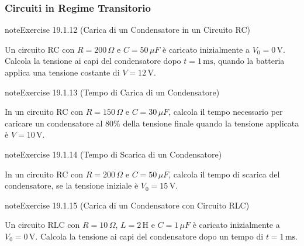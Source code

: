 \documentclass[letterpaper,10pt,italian]{jupyterBook}
\begin{document}
\subsubsection{Circuiti in Regime Transitorio}
\label{\detokenize{ch/electromagnetism/circuits-electric-problems:circuiti-in-regime-transitorio}} \label{exercise:ch/electromagnetism/circuits-electric-problems-exercise-11}

\begin{sphinxadmonition}{note}{Exercise 19.1.12 (Carica di un Condensatore in un Circuito RC)}



\sphinxAtStartPar
Un circuito RC con \(R = 200 \, \Omega\) e \(C = 50 \, \mu F\) è caricato inizialmente a \(V_0 = 0 \, \text{V}\). Calcola la tensione ai capi del condensatore dopo \(t = 1 \, \text{ms}\), quando la batteria applica una tensione costante di \(V = 12 \, \text{V}\).
\end{sphinxadmonition}
 \label{exercise:ch/electromagnetism/circuits-electric-problems-exercise-12}

\begin{sphinxadmonition}{note}{Exercise 19.1.13 (Tempo di Carica di un Condensatore)}



\sphinxAtStartPar
In un circuito RC con \(R = 150 \, \Omega\) e \(C = 30 \, \mu F\), calcola il tempo necessario per caricare un condensatore al 80\% della tensione finale quando la tensione applicata è \(V = 10 \, \text{V}\).
\end{sphinxadmonition}
 \label{exercise:ch/electromagnetism/circuits-electric-problems-exercise-13}

\begin{sphinxadmonition}{note}{Exercise 19.1.14 (Tempo di Scarica di un Condensatore)}



\sphinxAtStartPar
In un circuito RC con \(R = 200 \, \Omega\) e \(C = 50 \, \mu F\), calcola il tempo di scarica del condensatore, se la tensione iniziale è \(V_0 = 15 \, \text{V}\).
\end{sphinxadmonition}
 \label{exercise:ch/electromagnetism/circuits-electric-problems-exercise-14}

\begin{sphinxadmonition}{note}{Exercise 19.1.15 (Carica di un Condensatore con Circuito RLC)}



\sphinxAtStartPar
Un circuito RLC con \(R = 10 \, \Omega\), \(L = 2 \, \text{H}\) e \(C = 1 \, \mu F\) è caricato inizialmente a \(V_0 = 0 \, \text{V}\). Calcola la tensione ai capi del condensatore dopo un tempo di \(t = 1 \, \text{ms}\).
\end{sphinxadmonition}
 \label{exercise:ch/electromagnetism/circuits-electric-problems-exercise-15}
\end{document}
